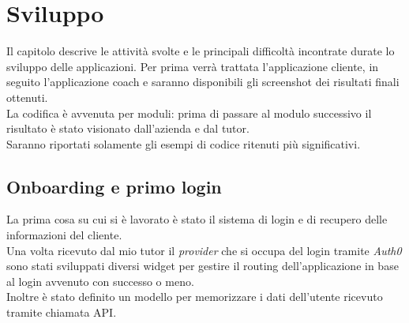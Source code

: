 
\chapter{Sviluppo}
\label{cap:sviluppo}
Il capitolo descrive le attività svolte e le principali difficoltà incontrate durate lo sviluppo delle applicazioni. Per prima verrà trattata l'applicazione cliente, in seguito l'applicazione coach e saranno disponibili gli screenshot dei risultati finali ottenuti.\\
La codifica è avvenuta per moduli: prima di passare al modulo successivo il risultato è stato visionato dall’azienda e dal tutor.\\
Saranno riportati solamente gli esempi di codice ritenuti più significativi.

\section{Onboarding e primo login}
La prima cosa su cui si è lavorato è stato il sistema di login e di recupero delle informazioni del cliente.\\
Una volta ricevuto dal mio tutor il \textit{provider} che si occupa del login tramite \textit{Auth0} sono stati sviluppati diversi widget per gestire il routing dell'applicazione in base al login avvenuto con successo o meno.\\
Inoltre è stato definito un modello per memorizzare i dati dell'utente ricevuto tramite chiamata API.
